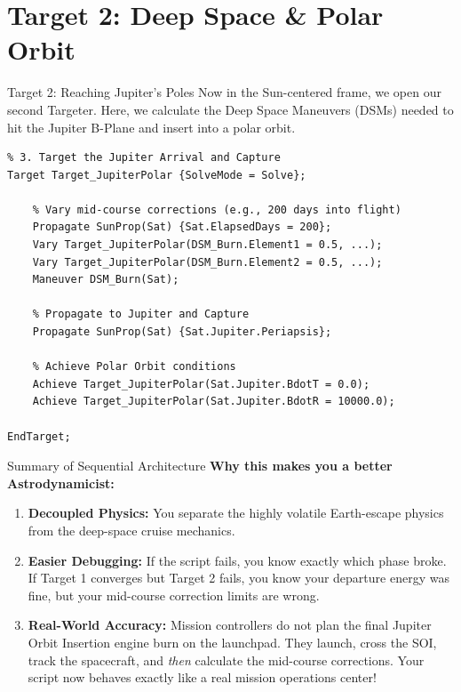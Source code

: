 \documentclass[11pt]{beamer}
\begin{document}
\section{Target 2: Deep Space \& Polar Orbit}

\begin{frame}[fragile]{Target 2: Reaching Jupiter's Poles}
    Now in the Sun-centered frame, we open our second Targeter. Here, we calculate the Deep Space Maneuvers (DSMs) needed to hit the Jupiter B-Plane and insert into a polar orbit.
    
\begin{lstlisting}
% 3. Target the Jupiter Arrival and Capture
Target Target_JupiterPolar {SolveMode = Solve};
    
    % Vary mid-course corrections (e.g., 200 days into flight)
    Propagate SunProp(Sat) {Sat.ElapsedDays = 200};
    Vary Target_JupiterPolar(DSM_Burn.Element1 = 0.5, ...);
    Vary Target_JupiterPolar(DSM_Burn.Element2 = 0.5, ...);
    Maneuver DSM_Burn(Sat);
    
    % Propagate to Jupiter and Capture
    Propagate SunProp(Sat) {Sat.Jupiter.Periapsis};
    
    % Achieve Polar Orbit conditions
    Achieve Target_JupiterPolar(Sat.Jupiter.BdotT = 0.0);
    Achieve Target_JupiterPolar(Sat.Jupiter.BdotR = 10000.0);
    
EndTarget;
\end{lstlisting}
\end{frame}

\begin{frame}{Summary of Sequential Architecture}
    \textbf{Why this makes you a better Astrodynamicist:}
    \begin{enumerate}
        \item \textbf{Decoupled Physics:} You separate the highly volatile Earth-escape physics from the deep-space cruise mechanics.
        \item \textbf{Easier Debugging:} If the script fails, you know exactly which phase broke. If Target 1 converges but Target 2 fails, you know your departure energy was fine, but your mid-course correction limits are wrong.
        \item \textbf{Real-World Accuracy:} Mission controllers do not plan the final Jupiter Orbit Insertion engine burn on the launchpad. They launch, cross the SOI, track the spacecraft, and \textit{then} calculate the mid-course corrections. Your script now behaves exactly like a real mission operations center!
    \end{enumerate}
\end{frame}
\end{document}
